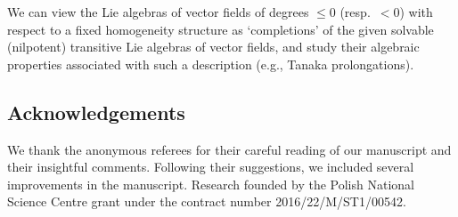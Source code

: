 \documentclass[pdftex]{sigma}
\numberwithin{equation}{section}
\begin{document}
We can view the Lie algebras of vector fields of degrees $\le 0$ (resp.~$<0$) with respect to a fixed homogeneity structure as `completions' of the given solvable (nilpotent) transitive Lie algebras of vector fields, and study their algebraic properties associated with such a description (e.g., Tanaka prolongations).

\subsection*{Acknowledgements}
We thank the anonymous referees for their careful reading of our manuscript and their insightful comments.
Following their suggestions, we included several improvements in the manuscript.
Research founded by the Polish National Science Centre grant under the contract number 2016/22/M/ST1/00542.
\end{document}
